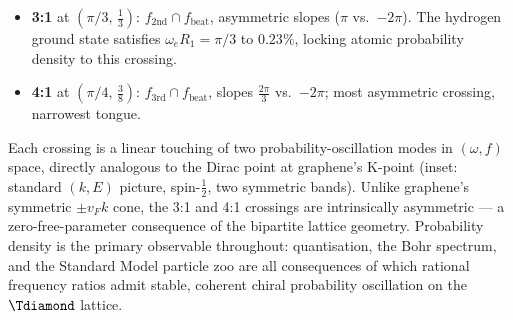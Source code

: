 {\begin{itemize}[noitemsep,topsep=2pt]
        this tongue, maximising orbital stability.
  \item \textbf{3:1} at $(\pi/3,\,\tfrac{1}{3})$:
        $f_\text{2nd} \cap f_\text{beat}$, asymmetric slopes ($\pi$
        vs.\ $-2\pi$).  The hydrogen ground state satisfies
        $\omega_e R_1 = \pi/3$ to $0.23\%$, locking atomic probability
        density to this crossing.
  \item \textbf{4:1} at $(\pi/4,\,\tfrac{3}{8})$:
        $f_\text{3rd} \cap f_\text{beat}$, slopes $\tfrac{2\pi}{3}$
        vs.\ $-2\pi$; most asymmetric crossing, narrowest tongue.
\end{itemize}
Each crossing is a linear touching of two probability-oscillation modes
in $(\omega, f)$ space, directly analogous to the Dirac point at
graphene's K-point (inset: standard $(k,E)$ picture, spin-$\tfrac{1}{2}$,
two symmetric bands).
Unlike graphene's symmetric $\pm v_F k$ cone, the 3:1 and 4:1 crossings
are intrinsically asymmetric --- a zero-free-parameter consequence of the
bipartite lattice geometry.
Probability density is the primary observable throughout: quantisation,
the Bohr spectrum, and the Standard Model particle zoo are all
consequences of which rational frequency ratios admit stable, coherent
chiral probability oscillation on the $\Tdiamond$ lattice.}
